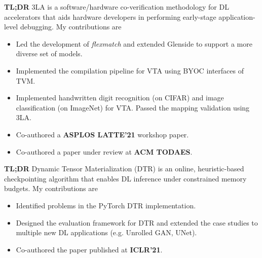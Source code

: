 \documentclass{resume}
\begin{document}
\textbf{TL;DR} 3LA is a software/hardware co-verification methodology for DL accelerators that aids hardware developers in performing early-stage application-level debugging. My contributions are
\begin{itemize}
    \item Led the development of \textit{flexmatch} and extended Glenside to support a more diverse set of models.
    \item Implemented the compilation pipeline for VTA using BYOC interfaces of TVM.
    \item Implemented handwritten digit recognition (on CIFAR) and image classification (on ImageNet) for VTA. Passed the mapping validation using 3LA.
    \item Co-authored a \textbf{ASPLOS LATTE'21} workshop paper.
    \item Co-authored a paper under review at \textbf{ACM TODAES}.
\end{itemize}
\textbf{TL;DR} Dynamic Tensor Materialization (DTR) is an online, heuristic-based checkpointing algorithm that enables DL inference under constrained memory budgets. My contributions are
\begin{itemize} 
    \item Identified problems in the PyTorch DTR implementation.
    \item Designed the evaluation framework for DTR and extended the case studies to multiple new DL applications (e.g. Unrolled GAN, UNet).
    \item Co-authored the paper published at \textbf{ICLR'21}.
\end{itemize}
\end{document}
